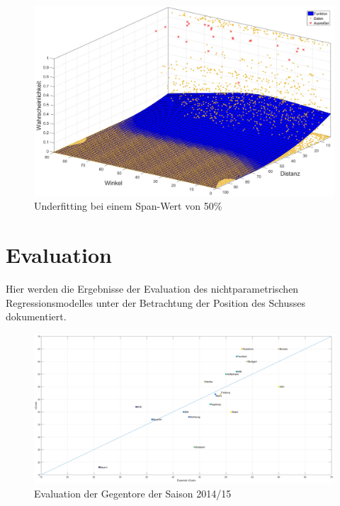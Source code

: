\begin{figure}[H]
\centering
\includegraphics[scale=0.34]{se-wa-jpg/splinewdTL}
\caption{Underfitting bei einem Span-Wert von 50\%}
\label{splinewdTL}
\end{figure}

\chapter{Evaluation}
\label{anheva}

Hier werden die Ergebnisse der Evaluation des nichtparametrischen Regressionsmodelles unter der Betrachtung der Position des Schusses dokumentiert. 

\begin{figure}
\centering
\includegraphics[scale=0.3]{se-wa-jpg/cGoals_correlation_14_15}
\caption{Evaluation der Gegentore der Saison 2014/15}
\label{cg1415}
\end{figure}

